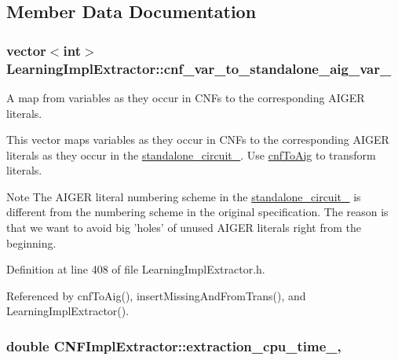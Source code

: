 \subsection{Member Data Documentation}
\hypertarget{classLearningImplExtractor_a2d096ab7181fd608d6ee033f8c9ab8d3}{
\subsubsection[{cnf\-\_\-var\-\_\-to\-\_\-standalone\-\_\-aig\-\_\-var\-\_\-}]{\setlength{\rightskip}{0pt plus 5cm}vector$<$int$>$ Learning\-Impl\-Extractor\-::cnf\-\_\-var\-\_\-to\-\_\-standalone\-\_\-aig\-\_\-var\-\_\-\hspace{0.3cm}{\ttfamily [protected]}}}\label{classLearningImplExtractor_a2d096ab7181fd608d6ee033f8c9ab8d3}


A map from variables as they occur in C\-N\-Fs to the corresponding A\-I\-G\-E\-R literals. 

This vector maps variables as they occur in C\-N\-Fs to the corresponding A\-I\-G\-E\-R literals as they occur in the \hyperlink{classLearningImplExtractor_a17f7c47bf3e84fa5a70930e01a18deb2}{standalone\-\_\-circuit\-\_\-}. Use \hyperlink{classLearningImplExtractor_a88143aa67de5be8848f643cfb2947834}{cnf\-To\-Aig} to transform literals.

\begin{DoxyNote}{Note}
The A\-I\-G\-E\-R literal numbering scheme in the \hyperlink{classLearningImplExtractor_a17f7c47bf3e84fa5a70930e01a18deb2}{standalone\-\_\-circuit\-\_\-} is different from the numbering scheme in the original specification. The reason is that we want to avoid big 'holes' of unused A\-I\-G\-E\-R literals right from the beginning. 
\end{DoxyNote}


Definition at line 408 of file Learning\-Impl\-Extractor.\-h.



Referenced by cnf\-To\-Aig(), insert\-Missing\-And\-From\-Trans(), and Learning\-Impl\-Extractor().

\hypertarget{classCNFImplExtractor_ab8be06d42fd3c4b569ec22cfcf2f508e}{
\subsubsection[{extraction\-\_\-cpu\-\_\-time\-\_\-}]{\setlength{\rightskip}{0pt plus 5cm}double C\-N\-F\-Impl\-Extractor\-::extraction\-\_\-cpu\-\_\-time\-\_\-\hspace{0.3cm}{\ttfamily [protected]}, {\ttfamily [inherited]}}}\label{classCNFImplExtractor_ab8be06d42fd3c4b569ec22cfcf2f508e}


